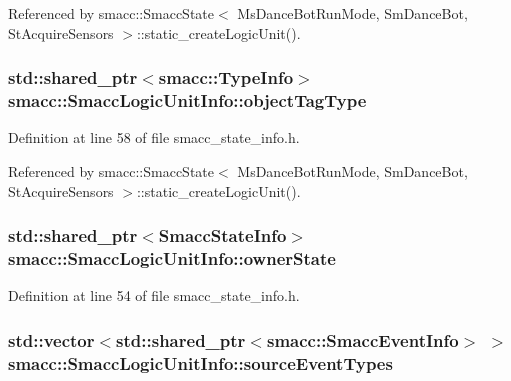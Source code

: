 Referenced by smacc\+::\+Smacc\+State$<$ Ms\+Dance\+Bot\+Run\+Mode, Sm\+Dance\+Bot, St\+Acquire\+Sensors $>$\+::static\+\_\+create\+Logic\+Unit().

\subsubsection[{\texorpdfstring{object\+Tag\+Type}{objectTagType}}]{\setlength{\rightskip}{0pt plus 5cm}std\+::shared\+\_\+ptr$<${\bf smacc\+::\+Type\+Info}$>$ smacc\+::\+Smacc\+Logic\+Unit\+Info\+::object\+Tag\+Type}\hypertarget{structsmacc_1_1SmaccLogicUnitInfo_a3950a3dd81640dfe1e8eaebd2870dabb}{}\label{structsmacc_1_1SmaccLogicUnitInfo_a3950a3dd81640dfe1e8eaebd2870dabb}


Definition at line 58 of file smacc\+\_\+state\+\_\+info.\+h.



Referenced by smacc\+::\+Smacc\+State$<$ Ms\+Dance\+Bot\+Run\+Mode, Sm\+Dance\+Bot, St\+Acquire\+Sensors $>$\+::static\+\_\+create\+Logic\+Unit().

\subsubsection[{\texorpdfstring{owner\+State}{ownerState}}]{\setlength{\rightskip}{0pt plus 5cm}std\+::shared\+\_\+ptr$<${\bf Smacc\+State\+Info}$>$ smacc\+::\+Smacc\+Logic\+Unit\+Info\+::owner\+State}\hypertarget{structsmacc_1_1SmaccLogicUnitInfo_a5584c7f4dac1938c089e8f9a2631ff6e}{}\label{structsmacc_1_1SmaccLogicUnitInfo_a5584c7f4dac1938c089e8f9a2631ff6e}


Definition at line 54 of file smacc\+\_\+state\+\_\+info.\+h.

\subsubsection[{\texorpdfstring{source\+Event\+Types}{sourceEventTypes}}]{\setlength{\rightskip}{0pt plus 5cm}std\+::vector$<$std\+::shared\+\_\+ptr$<${\bf smacc\+::\+Smacc\+Event\+Info}$>$ $>$ smacc\+::\+Smacc\+Logic\+Unit\+Info\+::source\+Event\+Types}\hypertarget{structsmacc_1_1SmaccLogicUnitInfo_ab753c234942c41eb973873f9222b9fd9}{}\label{structsmacc_1_1SmaccLogicUnitInfo_ab753c234942c41eb973873f9222b9fd9}



